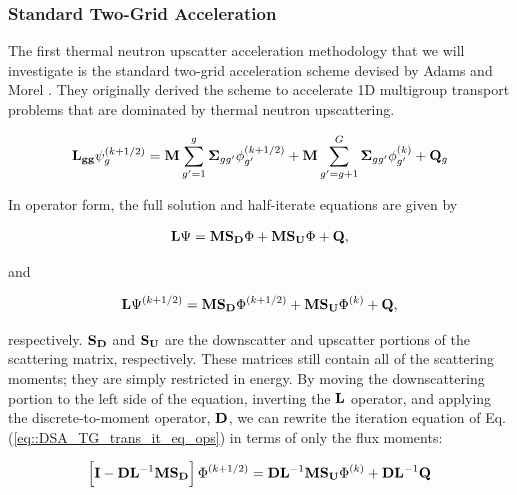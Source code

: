 \subsubsection{Standard Two-Grid Acceleration}
\label{sec:DSA_DSA_MG_TG}

The first thermal neutron upscatter acceleration methodology that we will investigate is the standard two-grid acceleration scheme devised by Adams and Morel \cite{adams1993two}. They originally derived the scheme to accelerate 1D multigroup transport problems that are dominated by thermal neutron upscattering. 

\begin{equation}
\label{eq::DSA_TG_trans_it_eq}
{\bf L_{gg}} \psi_g^{(k+1/2)} = {\bf M} \sum_{g'=1}^g {\bf \Sigma}_{g g'} \phi_{g'}^{(k+1/2)} + {\bf M} \sum_{g'=g+1}^G {\bf \Sigma}_{g g'} \phi_{g'}^{(k)} + {\bf Q}_g
\end{equation}

\noindent In operator form, the full solution and half-iterate equations are given by

\begin{equation}
\label{eq::DSA_TG_trans_eq_ops}
{\bf L} \Psi = {\bf M} {\bf S_D} \Phi + {\bf M} {\bf S_U} \Phi + {\bf Q} ,
\end{equation}

\noindent and

\begin{equation}
\label{eq::DSA_TG_trans_it_eq_ops}
{\bf L} \Psi^{(k+1/2)} = {\bf M} {\bf S_D} \Phi^{(k+1/2)} + {\bf M} {\bf S_U} \Phi^{(k)} + {\bf Q} ,
\end{equation}

\noindent respectively. ${\bf S_D}$ and ${\bf S_U}$ are the downscatter and upscatter portions of the scattering matrix, respectively. These matrices still contain all of the scattering moments; they are simply restricted in energy. By moving the downscattering portion to the left side of the equation, inverting the ${\bf L}$ operator, and applying the discrete-to-moment operator, ${\bf D}$, we can rewrite the iteration equation of Eq. (\ref{eq::DSA_TG_trans_it_eq_ops}) in terms of only the flux moments:

\begin{equation}
\label{eq::DSA_TG_half_it}
\left[ {\bf I} - {\bf D}{\bf L}^{-1} {\bf M} {\bf S_D} \right]\Phi^{(k+1/2)} = {\bf D}{\bf L}^{-1}  {\bf M} {\bf S_U} \Phi^{(k)} + {\bf D}{\bf L}^{-1}  {\bf Q}
\end{equation}

